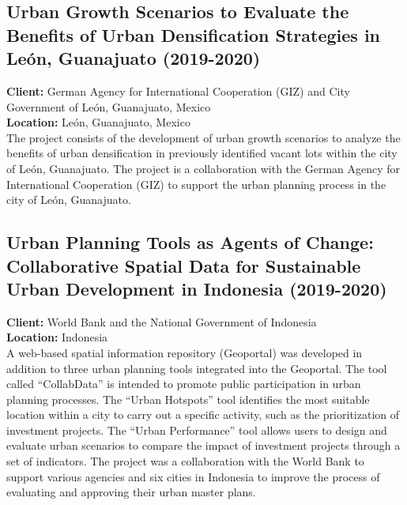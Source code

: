 \documentclass[
	a4paper,
	12pt,
	unnumberedsections,
]{CSSullivanBusinessReport}
\begin{document}
\subsection{Urban Growth Scenarios to Evaluate the Benefits of Urban Densification Strategies in León, Guanajuato (2019-2020)}
\textbf{Client:}  German Agency for International Cooperation (GIZ) and City Government of León, Guanajuato, Mexico \\
\textbf{Location:}  León, Guanajuato, Mexico \\[0.5em]
 The project consists of the development of urban growth scenarios to analyze the benefits of urban densification in previously identified vacant lots within the city of León, Guanajuato. The project is a collaboration with the German Agency for International Cooperation (GIZ) to support the urban planning process in the city of León, Guanajuato.

\subsection{Urban Planning Tools as Agents of Change: Collaborative Spatial Data for Sustainable Urban Development in Indonesia (2019-2020)}
\textbf{Client:}  World Bank and the National Government of Indonesia \\
\textbf{Location:}  Indonesia \\[0.5em]
 A web-based spatial information repository (Geoportal) was developed in addition to three urban planning tools integrated into the Geoportal. The tool called “CollabData” is intended to promote public participation in urban planning processes. The “Urban Hotspots” tool identifies the most suitable location within a city to carry out a specific activity, such as the prioritization of investment projects. The “Urban Performance” tool allows users to design and evaluate urban scenarios to compare the impact of investment projects through a set of indicators. The project was a collaboration with the World Bank to support various agencies and six cities in Indonesia to improve the process of evaluating and approving their urban master plans.
\end{document}
